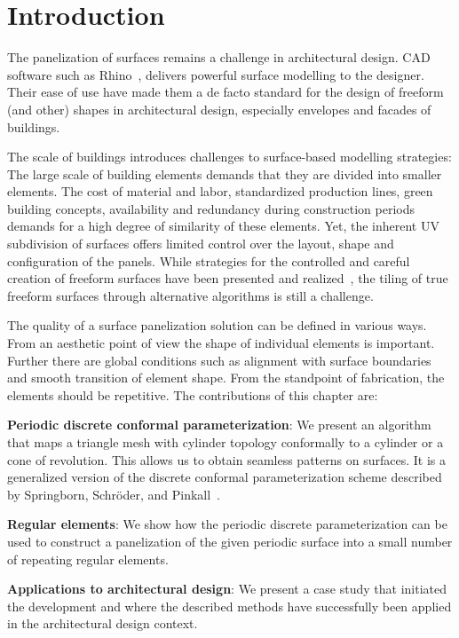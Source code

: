 \documentclass[Thesis.tex]{subfiles}
\begin{document}
\section{Introduction}
\label{sec:introduction}

The panelization of surfaces remains a challenge in architectural
design. CAD software such as Rhino~\cite{rhino-website}, delivers powerful \nurbs surface
modelling to the designer. Their ease of use have made them a de facto
standard for the design of freeform (and other) shapes in
architectural design, especially envelopes and facades of buildings.  

The scale of buildings introduces challenges to surface-based
modelling strategies: The large scale of building elements demands
that they are divided into smaller elements. The cost of material and
labor, standardized production lines, green building concepts,
availability and redundancy during construction periods demands for a
high degree of similarity of these elements. Yet, the inherent
UV subdivision of \nurbs surfaces offers limited control over the
layout, shape and configuration of the panels. While strategies for
the controlled and careful creation of freeform surfaces have been
presented and realized~\cite{GlymphSCMS2004}, the tiling of true
freeform surfaces through alternative algorithms is still a challenge.

The quality of a surface panelization solution can be defined in
various ways. From an aesthetic point of view the shape of individual
elements is important. Further there are global conditions such as
alignment with surface boundaries and smooth transition of element
shape. From the standpoint of fabrication, the elements should be
repetitive. The contributions of this chapter are:

\begin{compactitem}[$\bullet$]
\item {\bf Periodic discrete conformal parameterization}:
  We present an algorithm that maps a triangle mesh with cylinder
  topology conformally to a cylinder or a cone of revolution. This
  allows us to obtain seamless patterns on surfaces. It is a
  generalized version of the discrete conformal parameterization
  scheme described by Springborn, Schr\"{o}der, and Pinkall~\cite{Springborn2008}.
\item {\bf Regular elements}:
  We show how the periodic discrete parameterization can be used to
  construct a panelization of the given periodic surface into a small
  number of repeating regular elements.
\item {\bf Applications to architectural design}: 
  We present a case study that initiated the development and where the
  described methods have successfully been applied in the architectural design
  context.
\end{compactitem}
\end{document}
